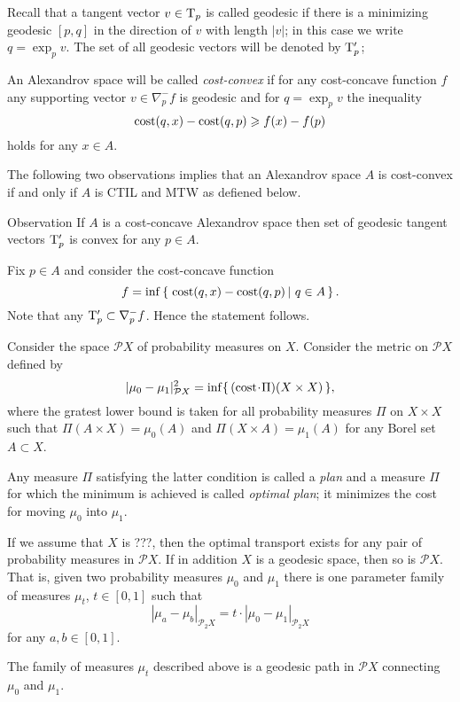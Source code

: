 Recall that a tangent vector $v\in\mathrm{T}_p$ is called geodesic if there is a minimizing geodesic $[p,q]$ in the direction of $v$ with length $|v|$;
in this case we write $q=\exp_pv$.
The set of all geodesic vectors will be denoted by $\mathrm{T}'_p$;

An Alexandrov space will be called \emph{cost-convex} if 
for any cost-concave function $f$ any supporting vector $v\in\nabla^-_pf$ is geodesic 
and for $q=\exp_pv$ the inequality 
\[\text{\rm cost}(q,x)-\text{\rm cost}(q,p)\geqslant f(x)-f(p)\]
holds for any $x\in A$.

The following two observations implies that an Alexandrov space $A$ is cost-convex if and only if $A$ is CTIL and MTW as defiened below. 

\begin{thm}{Observation}
If $A$ is a cost-concave Alexandrov space then set of geodesic tangent vectors $\mathrm{T}'_p$ is convex for any $p\in A$. 
\end{thm}

Fix $p\in A$ and consider the cost-concave function 
\[f=\inf\set{\cost(q,x)-\cost(q,p)}{q\in A}.\]
Note that any $\mathrm{T}'_p\subset \nabla^-_pf$.
Hence the statement follows.
\qeds

Consider the space $\mathcal{P}X$ of probability measures on $X$.
Consider the metric on  $\mathcal{P}X$
defined by 
\[|\mu_0-\mu_1|^2_{\mathcal{P}X}=\inf\{\,(\cost\cdot \Pi)(X\times X)\,\},\]
where the gratest lower bound is taken for all probability measures $\Pi$ on $X\times X$ such that $\Pi(A\times X)=\mu_0(A)$ and $\Pi(X\times A)=\mu_1(A)$ for any Borel set $A\subset X$.

Any measure $\Pi$ satisfying the latter condition is called a \emph{plan} and a measure $\Pi$ for which the minimum is achieved is called \emph{optimal plan}; it minimizes the cost for moving $\mu_0$ into $\mu_1$.

If we assume that $X$ is ???, then the optimal transport exists for any pair of probability measures in $\mathcal{P}X$.
If in addition $X$ is a geodesic space, then so is $\mathcal{P}X$.
That is, given two probability measures $\mu_0$ and $\mu_1$ there is one parameter family of measures $\mu_t$, $t\in [0,1]$ such that 
\[|\mu_a-\mu_b|_{\mathcal{P}_2X}=t\cdot |\mu_0-\mu_1|_{\mathcal{P}_2X}\]
for any $a,b\in [0,1]$.

The family of measures $\mu_t$ described above is a geodesic path in $\mathcal{P}X$ connecting $\mu_0$ and $\mu_1$. 

